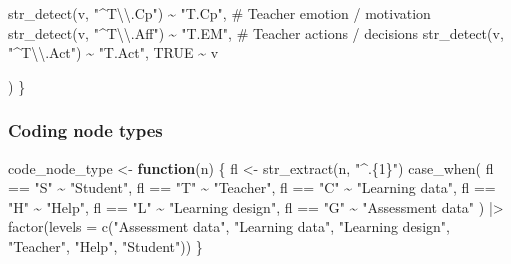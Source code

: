\documentclass[
  letterpaper,
  DIV=11,
  numbers=noendperiod]{scrartcl}
\newenvironment{Shaded}{\begin{snugshade}}{\end{snugshade}}
\newcommand{\AttributeTok}[1]{\textcolor[rgb]{0.40,0.45,0.13}{#1}}
\newcommand{\CommentTok}[1]{\textcolor[rgb]{0.37,0.37,0.37}{#1}}
\newcommand{\ConstantTok}[1]{\textcolor[rgb]{0.56,0.35,0.01}{#1}}
\newcommand{\ControlFlowTok}[1]{\textcolor[rgb]{0.00,0.23,0.31}{\textbf{#1}}}
\newcommand{\FunctionTok}[1]{\textcolor[rgb]{0.28,0.35,0.67}{#1}}
\newcommand{\NormalTok}[1]{\textcolor[rgb]{0.00,0.23,0.31}{#1}}
\newcommand{\OtherTok}[1]{\textcolor[rgb]{0.00,0.23,0.31}{#1}}
\newcommand{\SpecialCharTok}[1]{\textcolor[rgb]{0.37,0.37,0.37}{#1}}
\newcommand{\StringTok}[1]{\textcolor[rgb]{0.13,0.47,0.30}{#1}}
\begin{document}
\begin{Shaded}
\begin{Highlighting}[]
        \FunctionTok{str\_detect}\NormalTok{(v, }\StringTok{"\^{}T}\SpecialCharTok{\textbackslash{}\textbackslash{}}\StringTok{.Cp"}\NormalTok{) }\SpecialCharTok{\textasciitilde{}} \StringTok{"T.Cp"}\NormalTok{,}
        \CommentTok{\# Teacher emotion / motivation}
        \FunctionTok{str\_detect}\NormalTok{(v, }\StringTok{"\^{}T}\SpecialCharTok{\textbackslash{}\textbackslash{}}\StringTok{.Aff"}\NormalTok{) }\SpecialCharTok{\textasciitilde{}} \StringTok{"T.EM"}\NormalTok{,}
        \CommentTok{\# Teacher actions / decisions}
        \FunctionTok{str\_detect}\NormalTok{(v, }\StringTok{"\^{}T}\SpecialCharTok{\textbackslash{}\textbackslash{}}\StringTok{.Act"}\NormalTok{) }\SpecialCharTok{\textasciitilde{}} \StringTok{"T.Act"}\NormalTok{,}
        \ConstantTok{TRUE} \SpecialCharTok{\textasciitilde{}}\NormalTok{ v}
        
\NormalTok{    )}
\NormalTok{\}}
\end{Highlighting}
\end{Shaded}

\subsubsection{Coding node types}\label{coding-node-types}

\begin{Shaded}
\begin{Highlighting}[]
\NormalTok{code\_node\_type }\OtherTok{\textless{}{-}} \ControlFlowTok{function}\NormalTok{(n) \{}
\NormalTok{    fl }\OtherTok{\textless{}{-}} \FunctionTok{str\_extract}\NormalTok{(n, }\StringTok{"\^{}.\{1\}"}\NormalTok{)}
    \FunctionTok{case\_when}\NormalTok{(}
\NormalTok{        fl }\SpecialCharTok{==} \StringTok{"S"} \SpecialCharTok{\textasciitilde{}} \StringTok{"Student"}\NormalTok{,}
\NormalTok{        fl }\SpecialCharTok{==} \StringTok{"T"} \SpecialCharTok{\textasciitilde{}} \StringTok{"Teacher"}\NormalTok{,}
\NormalTok{        fl }\SpecialCharTok{==} \StringTok{"C"} \SpecialCharTok{\textasciitilde{}} \StringTok{"Learning data"}\NormalTok{,}
\NormalTok{        fl }\SpecialCharTok{==} \StringTok{"H"} \SpecialCharTok{\textasciitilde{}} \StringTok{"Help"}\NormalTok{,}
\NormalTok{        fl }\SpecialCharTok{==} \StringTok{"L"} \SpecialCharTok{\textasciitilde{}} \StringTok{"Learning design"}\NormalTok{,}
\NormalTok{        fl }\SpecialCharTok{==} \StringTok{"G"} \SpecialCharTok{\textasciitilde{}} \StringTok{"Assessment data"}
\NormalTok{    ) }\SpecialCharTok{|\textgreater{}} 
        \FunctionTok{factor}\NormalTok{(}\AttributeTok{levels =} \FunctionTok{c}\NormalTok{(}\StringTok{"Assessment data"}\NormalTok{, }\StringTok{"Learning data"}\NormalTok{, }\StringTok{"Learning design"}\NormalTok{, }\StringTok{"Teacher"}\NormalTok{, }\StringTok{"Help"}\NormalTok{, }\StringTok{"Student"}\NormalTok{))}
\NormalTok{\}}
\end{Highlighting}
\end{Shaded}
\end{document}
